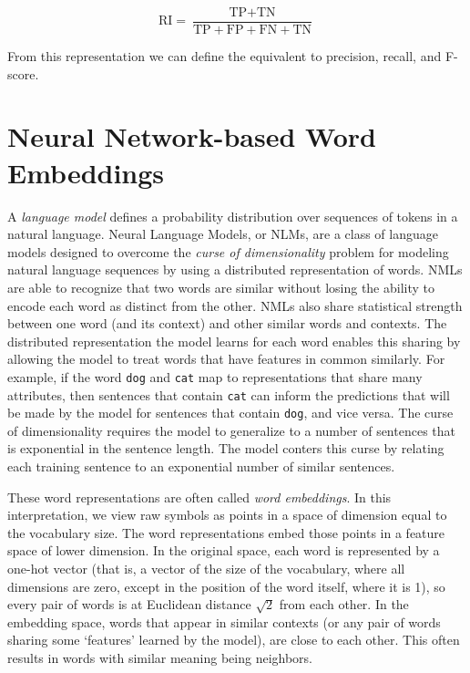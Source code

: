 \begin{equation}
    \text{RI} = \frac{ \text{TP} + \text{TN} }{ \text{TP} + \text{FP} + \text{FN} + \text{TN}}
\end{equation}

From this representation we can define the equivalent to precision, recall, and
F-score.

\section{Neural Network-based Word Embeddings}

A {\em language model} defines a probability distribution over sequences of
tokens in a natural language.
%
Neural Language Models, or NLMs, are a class of language models designed to
overcome the {\em curse of dimensionality} problem for modeling natural language
sequences by using a distributed representation of words.
%
NMLs are able to recognize that two words are similar without losing the ability
to encode each word as distinct from the other.
%
NMLs also share statistical strength between one word (and its context) and
other similar words and contexts.
%
The distributed representation the model learns for each word enables this
sharing by allowing the model to treat words that have features in common
similarly.
%
For example, if the word {\tt dog} and {\tt cat} map to representations that
share many attributes, then sentences that contain {\tt cat} can inform the
predictions that will be made by the model for sentences that contain {\tt dog},
and vice versa.
%
The curse of dimensionality requires the model to generalize to a number of
sentences that is exponential in the sentence length.
%
The model conters this curse by relating each training sentence to an
exponential number of similar sentences.


These word representations are often called {\em word embeddings}. 
%
In this interpretation, we view raw symbols as points in a space of dimension
equal to the vocabulary size.
%
The word representations embed those points in a feature space of lower dimension.
%
In the original space, each word is represented by a one-hot vector (that is, a
vector of the size of the vocabulary, where all dimensions are zero, except in
the position of the word itself, where it is 1), so every pair of words is at
Euclidean distance $\sqrt{2}$ from each other.
%
In the embedding space, words that appear in similar contexts (or any pair of
words sharing some `features' learned by the model), are close to each other.
%
This often results in words with similar meaning being neighbors.


